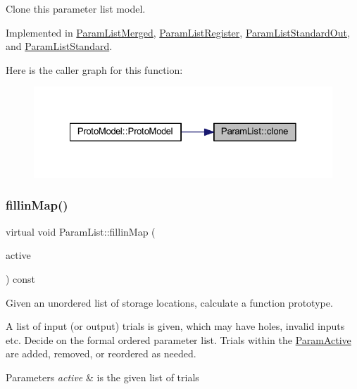 Clone this parameter list model. 



Implemented in \mbox{\hyperlink{class_param_list_merged_a98c49178195f02a964dd87b9e8fcddfa}{Param\+List\+Merged}}, \mbox{\hyperlink{class_param_list_register_a1c4f79c909f11b3859f93f293acb9a1d}{Param\+List\+Register}}, \mbox{\hyperlink{class_param_list_standard_out_acec6ec68623556e54bdf42a61c20ea0e}{Param\+List\+Standard\+Out}}, and \mbox{\hyperlink{class_param_list_standard_a8257219823fdb31ac4aa59d2c0c640e5}{Param\+List\+Standard}}.

Here is the caller graph for this function\+:
\nopagebreak
\begin{figure}[H]
\begin{center}
\leavevmode
\includegraphics[width=328pt]{class_param_list_ac6ab0a8bc1ea2e7f84a5148c6be721d8_icgraph}
\end{center}
\end{figure}
\mbox{\label{class_param_list_aaf2680343e933767d7ffd38e22e84011}} 
\subsubsection{\texorpdfstring{fillinMap()}{fillinMap()}}
{\footnotesize\ttfamily virtual void Param\+List\+::fillin\+Map (\begin{DoxyParamCaption}\item[{\mbox{\hyperlink{class_param_active}{Param\+Active}} $\ast$}]{active }\end{DoxyParamCaption}) const\hspace{0.3cm}{\ttfamily [pure virtual]}}



Given an unordered list of storage locations, calculate a function prototype. 

A list of input (or output) trials is given, which may have holes, invalid inputs etc. Decide on the formal ordered parameter list. Trials within the \mbox{\hyperlink{class_param_active}{Param\+Active}} are added, removed, or reordered as needed. 
\begin{DoxyParams}{Parameters}
{\em active} & is the given list of trials \\
\hline
\end{DoxyParams}


